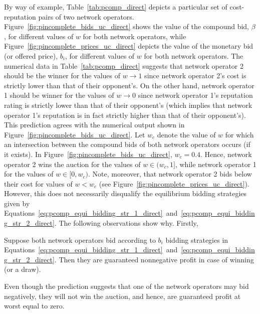 By way of example, Table~\ref{tab:pcomp_direct} depicts a particular set of cost-reputation pairs of two network operators. Figure~\ref{fig:pincomplete_bids_uc_direct} shows the value of the compound bid, $\beta$, for different values of $w$ for both network operators, while Figure~\ref{fig:pincomplete_prices_uc_direct} depicts the value of the monetary bid (or offered price), $b_i$, for different values of $w$ for both network operators. The numerical data in Table~\ref{tab:pcomp_direct} suggests that network operator 2 should be the winner for the values of $w\rightarrow 1$ since network operator 2's cost is strictly lower than that of their opponent's. On the other hand, network operator 1 should be winner for the values of $w\rightarrow 0$ since network operator 1's reputation rating is strictly lower than that of their opponent's (which implies that network operator 1's reputation is in fact strictly higher than that of their opponent's). This prediction agrees with the numerical output shown in Figure~\ref{fig:pincomplete_bids_uc_direct}. Let $w_c$ denote the value of $w$ for which an intersection between the compound bids of both network operators occurs (if it exists). In Figure~\ref{fig:pincomplete_bids_uc_direct}, $w_c=0.4$. Hence, network operator 2 wins the auction for the values of $w\in(w_c,1]$, while network operator 1 for the values of $w\in[0,w_c)$. Note, moreover, that network operator 2 bids below their cost for values of $w<w_c$ (see Figure~\ref{fig:pincomplete_prices_uc_direct}). However, this does not necessarily disqualify the equilibrium bidding strategies given by Equations~\eqref{eq:pcomp_equi_bidding_str_1_direct}~and~\eqref{eq:pcomp_equi_bidding_str_2_direct}. The following observations show why. Firstly,
\begin{proposition}
\label{prop:pcomp_negative_bids_direct}
Suppose both network operators bid according to $b_i$ bidding strategies in Equations~\eqref{eq:pcomp_equi_bidding_str_1_direct}~and~\eqref{eq:pcomp_equi_bidding_str_2_direct}. Then they are guaranteed nonnegative profit in case of winning (or a draw).
\end{proposition}
\noindent Even though the prediction suggests that one of the network operators may bid negatively, they will not win the auction, and hence, are guaranteed profit at worst equal to zero.

